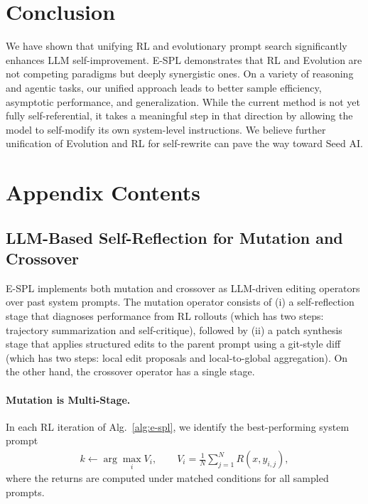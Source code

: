 \documentclass{article}
\theoremstyle{plain}
\theoremstyle{definition}
\theoremstyle{remark}
\begin{document}
\vspace{-6pt}
\section{Conclusion}
We have shown that unifying RL and evolutionary prompt search significantly enhances LLM self-improvement. E-SPL demonstrates that RL and Evolution are not competing paradigms but deeply synergistic ones. On a variety of reasoning and agentic tasks, our unified approach leads to better sample efficiency, asymptotic performance, and generalization. While the current method is not yet fully self-referential, it takes a meaningful step in that direction by allowing the model to self-modify its own system-level instructions. We believe further unification of Evolution and RL for self-rewrite can pave the way toward Seed AI.

\clearpage
\newpage

\nocite{langley00}





\newpage
\appendix
\onecolumn
\section{Appendix Contents}

\subsection{LLM-Based Self-Reflection for Mutation and Crossover}
\label{sec:appendix-self-reflection}

E-SPL implements both mutation and crossover as LLM-driven editing operators over past system prompts. The mutation operator consists of (i) a self-reflection stage that diagnoses performance from RL rollouts (which has two steps: trajectory summarization and self-critique), followed by (ii) a patch synthesis stage that applies structured edits to the parent prompt using a git-style diff (which has two steps: local edit proposals and local-to-global aggregation). On the other hand, the crossover operator has a single stage.

\paragraph{Mutation is Multi-Stage.}
In each RL iteration of Alg.~\ref{alg:e-spl}, we identify the best-performing system prompt
\begin{align}
k \leftarrow \arg\max_i V_i, \qquad V_i = \frac{1}{N}\sum_{j=1}^N R(x,y_{i,j}),
\end{align}
where the returns are computed under matched conditions for all sampled prompts.
\end{document}

